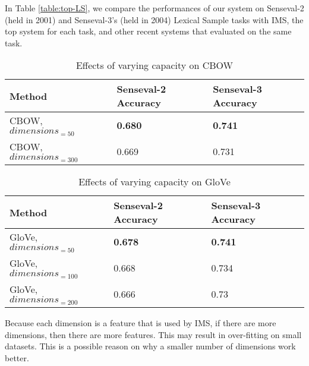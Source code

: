 \documentclass[11pt]{article}
\begin{document}
In Table \ref{table:top-LS}, we compare the performances of our system on Senseval-2 (held in 2001) and Senseval-3's (held in 2004) Lexical Sample tasks with IMS, the top system for each task, and other recent systems that evaluated on the same task.


\begin{table}[ht]
	\caption{Effects of varying capacity on CBOW}
	\label{table:wordembeddings-word2vec-accuracy}
	\begin{center}
		\begin{tabular}{| p{7cm} | p{4cm} | p{4cm} |}
			\hline
			Method & Senseval-2 Accuracy & Senseval-3 Accuracy \\
			\hline
			CBOW, $dimensions_{=50}$ & {\bf0.680} & {\bf0.741} \\
			\hline
			CBOW, $dimensions_{=300}$ & 0.669 & 0.731 \\
			\hline
			
		\end{tabular}
	\end{center}
\end{table}

\begin{table}[ht]
	\caption{Effects of varying capacity on GloVe}
	\label{table:wordembeddings-glove-accuracy}
	\begin{center}
		\begin{tabular}{| p{7cm} | p{4cm} | p{4cm} |}
			\hline
			Method & Senseval-2 Accuracy & Senseval-3 Accuracy \\
			\hline
			GloVe, $dimensions_{=50}$ & {\bf0.678} & {\bf0.741} \\
			\hline
			GloVe, $dimensions_{=100}$ & 0.668 & 0.734 \\
			\hline
			GloVe, $dimensions_{=200}$ & 0.666 & 0.73 \\
			\hline
			
		\end{tabular}
	\end{center}
\end{table}



Because each dimension is a feature that is used by IMS, if there are more dimensions, then there are more features. This may result in over-fitting on small datasets. This is a possible reason on why a smaller number of dimensions work better. 
\end{document}
